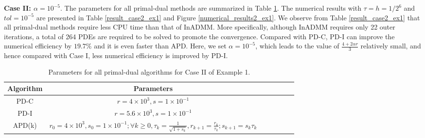 \documentclass[final]{siamart171218}
\theoremstyle{remark}
\begin{document}
\medskip

\noindent\textbf{Case II: $\alpha=10^{-5}$}. The parameters for all primal-dual methods are summarized in Table \ref{parameter_case2_ex1}. The numerical results with $\tau=h={1}/{2^6}$ and $tol=10^{-5}$ are presented in Table \ref{result_case2_ex1} and Figure \ref{numerical_results2_ex1}.
We observe from Table \ref{result_case2_ex1} that all primal-dual methods require less CPU time than that of InADMM. More specifically, although {InADMM} requires only 22 outer iterations, a total of 264 PDEs are required to be solved to promote the convergence. Compared with PD-C, PD-I can improve the numerical efficiency by $19.7\%$ and it is even faster than APD.  Here, we set $\alpha=10^{-5}$, which leads to the value of $\frac{4+2\alpha r}{3}$ relatively small, and hence compared with Case I, less numerical efficiency is improved by PD-I.
\begin{table}[h!]
	\centering
	\caption{Parameters for all primal-dual algorithms for Case II of Example 1.}\label{parameter_case2_ex1}
	{\footnotesize\begin{tabular}{|c|c|c|c|c|c|c|}
			\hline
			Algorithm&Parameters\\
			\hline
			PD-C& $r=4\times 10^3, s=1\times 10^{-1}$\\
			\hline
			PD-I& $r=5.6\times 10^3, s=1\times 10^{-1}$\\
			\hline
			{APD}(k)& $r_0=4\times 10^3, s_0=1\times 10^{-1};\forall k\geq0, \tau_k=\frac{1}{\sqrt{1+s_k}}, r_{k+1}=\frac{r_k}{\tau_k}; s_{k+1}=s_k\tau_k$\\
			\hline
		\end{tabular}
	}
\end{table}
\end{document}
